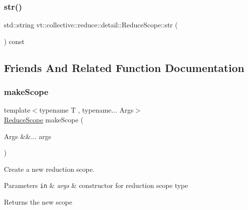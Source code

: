 \subsubsection{\texorpdfstring{str()}{str()}}
{\footnotesize\ttfamily std\+::string vt\+::collective\+::reduce\+::detail\+::\+Reduce\+Scope\+::str (\begin{DoxyParamCaption}{ }\end{DoxyParamCaption}) const\hspace{0.3cm}{\ttfamily [inline]}}



\subsection{Friends And Related Function Documentation}
\mbox{\label{structvt_1_1collective_1_1reduce_1_1detail_1_1_reduce_scope_affabcae30d44dc7901117edf23a14884}} 
\subsubsection{\texorpdfstring{make\+Scope}{makeScope}}
{\footnotesize\ttfamily template$<$typename T , typename... Args$>$ \\
\hyperlink{structvt_1_1collective_1_1reduce_1_1detail_1_1_reduce_scope}{Reduce\+Scope} make\+Scope (\begin{DoxyParamCaption}\item[{Args \&\&...}]{args }\end{DoxyParamCaption})\hspace{0.3cm}{\ttfamily [friend]}}



Create a new reduction scope. 


\begin{DoxyParams}[1]{Parameters}
\mbox{\tt in}  & {\em args} & constructor for reduction scope type\\
\hline
\end{DoxyParams}
\begin{DoxyReturn}{Returns}
the new scope 
\end{DoxyReturn}


